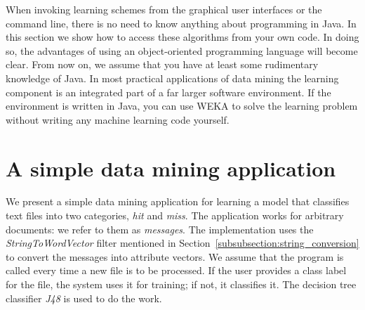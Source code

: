 When invoking learning schemes from the graphical user interfaces or
the command line, there is no need to know anything about programming
in Java. In this section we show how to access these algorithms from
your own code. In doing so, the advantages of using an object-oriented
programming language will become clear. From now on, we assume that
you have at least some rudimentary knowledge of Java. In most
practical applications of data mining the learning component is an
integrated part of a far larger software environment. If the
environment is written in Java, you can use WEKA to solve the learning
problem without writing any machine learning code yourself.

\section{A simple data mining application}

We present a simple data mining application for learning a model that
classifies text files into two categories, \textit{hit} and
\textit{miss}. The application works for arbitrary documents: we refer
to them as \textit{messages}. The implementation uses the
\textit{StringToWordVector} filter mentioned in
Section~\ref{subsubsection:string_conversion} to convert the
messages into attribute vectors. We assume that the program is called
every time a new file is to be processed. If the user provides a class
label for the file, the system uses it for training; if not, it
classifies it. The decision tree classifier \textit{J48} is used to do
the work.

